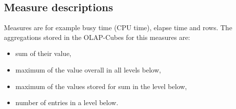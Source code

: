 \subsection{Measure descriptions}
Measures are for example busy time (CPU time), elapse time and rows. The aggregations stored in the
OLAP-Cubes for this measures are:
\begin{itemize}
 \item sum of their value,
 \item maximum of the value overall in all levels below,
 \item maximum of the values stored for sum in the level below,
 \item number of entries in a level below.
\end{itemize}



  
